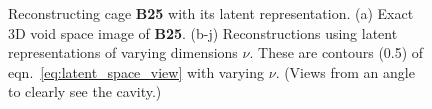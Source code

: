 \documentclass[journal=jacsat,manuscript=article,layout=traditional]{achemso}
\begin{document}
\begin{figure}
	\qquad
	\caption{Reconstructing cage \textbf{B25} with its latent representation. (a) Exact 3D void space image of \textbf{B25}. (b-j) Reconstructions using latent representations of varying dimensions $\nu$. These are contours (0.5) of eqn.~\ref{eq:latent_space_view} with varying $\nu$. (Views from an angle to clearly see the cavity.)
	} \label{fig:cage_reconstruction}
\end{figure}
\end{document}
